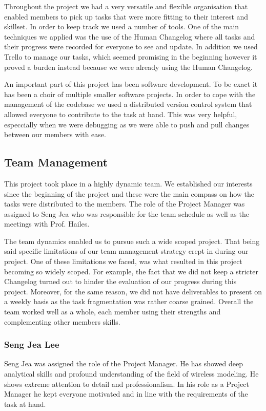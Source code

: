 Throughout the project we had a very versatile and flexible organisation that
enabled members to pick up tasks that were more fitting to their interest and
skillset. In order to keep track we used a number of tools. One of the main
techniques we applied was the use of the Human Changelog where all tasks and
their progress were recorded for everyone to see and update. In addition we used
Trello to manage our tasks, which seemed promising in the beginning however it
proved a burden instead because we were already using the Human Changelog.

An important part of this project has been software development. To be exact it
has been a choir of multiple smaller software projects. In order to cope with
the management of the codebase we used a distributed version control system that
allowed everyone to contribute to the task at hand. This was very helpful,
especcially when we were debugging as we were able to push and pull changes
between our members with ease.


\subsection{Team Management}
This project took place in a highly dynamic team. We established our interests
since the beginning of the project and these were the main compass on how the
tasks were distributed to the members. The role of the Project Manager was
assigned to Seng Jea who was responsible for the team schedule as well as the
meetings with Prof. Hailes.

The team dynamics enabled us to pursue such a wide scoped project. That being
said specific limitations of our team management strategy crept in during our
project. One of these limitations we faced, was what resulted in this project
becoming so widely scoped. For example, the fact that we did not keep a stricter
Changelog turned out to hinder the evaluation of our progress during this
project. Moreover, for the same reason, we did not have deliverables to present
on a weekly basis as the task fragmentation was rather coarse grained. Overall
the team worked well as a whole, each member using their strengths and
complementing other members skills.

\subsubsection{Seng Jea Lee}
Seng Jea was assigned the role of the Project Manager. He has showed deep
analytical skills and profound understanding of the field of wireless modeling.
He shows extreme attention to detail and professionalism. In his role as a
Project Manager he kept everyone motivated and in line with the requirements of
the task at hand.

